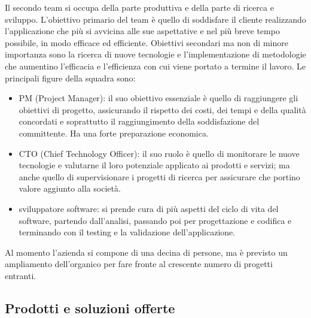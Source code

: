 Il secondo team si occupa della parte produttiva e della parte di ricerca e sviluppo. L'obiettivo primario del team \`e quello di soddisfare il cliente realizzando l'applicazione che pi\`u si avvicina alle sue aspettative e nel pi\`u breve tempo possibile, in modo efficace ed efficiente. Obiettivi secondari ma non di minore importanza sono la ricerca di nuove tecnologie e l'implementazione di metodologie che aumentino l'efficacia e l'efficienza con cui viene portato a termine il lavoro.
Le principali figure della squadra sono:
\begin{itemize}
	\item PM (Project Manager): il suo obiettivo essenziale è quello di raggiungere gli obiettivi di progetto, assicurando il rispetto dei costi, dei tempi e della qualità concordati e soprattutto il raggiungimento della soddisfazione del committente. Ha una forte preparazione economica.
	\item CTO (Chief Technology Officer): il suo ruolo \`e quello di monitorare le nuove tecnologie e valutarne il loro potenziale applicato ai prodotti e servizi; ma anche quello di supervisionare i progetti di ricerca per assicurare che portino valore aggiunto alla societ\`a.
	\item sviluppatore software:  si prende cura di pi\`u aspetti del ciclo di vita del software, partendo dall'analisi, passando poi per progettazione e codifica e terminando con il testing e la validazione dell'applicazione. 
\end{itemize} 

Al momento l'azienda si compone di una decina di persone, ma \`e previsto un ampliamento dell'organico per fare fronte al crescente numero di progetti entranti.

\subsection{Prodotti e soluzioni offerte}
